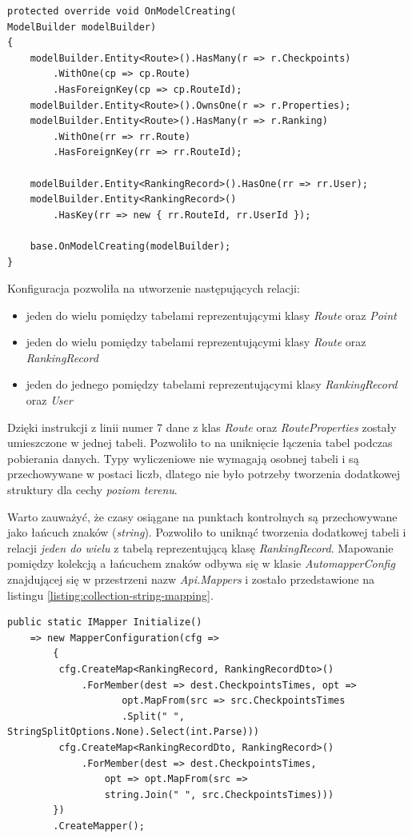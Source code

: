 \begin{lstlisting}[caption={Konfiguracja mapowania relacyjno-obiektowego},label=listing:context]
protected override void OnModelCreating(
ModelBuilder modelBuilder)
{
    modelBuilder.Entity<Route>().HasMany(r => r.Checkpoints)
    	.WithOne(cp => cp.Route)
    	.HasForeignKey(cp => cp.RouteId);
    modelBuilder.Entity<Route>().OwnsOne(r => r.Properties);
    modelBuilder.Entity<Route>().HasMany(r => r.Ranking)
    	.WithOne(rr => rr.Route)
        .HasForeignKey(rr => rr.RouteId);

    modelBuilder.Entity<RankingRecord>().HasOne(rr => rr.User);
    modelBuilder.Entity<RankingRecord>()
    	.HasKey(rr => new { rr.RouteId, rr.UserId });

    base.OnModelCreating(modelBuilder);
}
\end{lstlisting}
Konfiguracja pozwoliła na utworzenie następujących relacji:
\begin{itemize}
\item{jeden do wielu pomiędzy tabelami reprezentującymi klasy \textit{Route}} oraz \textit{Point}
\item{jeden do wielu pomiędzy tabelami reprezentującymi klasy \textit{Route}} oraz \textit{RankingRecord}
\item{jeden do jednego pomiędzy tabelami reprezentującymi klasy \textit{RankingRecord} oraz \textit{User}}
\end{itemize}
Dzięki instrukcji z linii numer 7 dane z klas \textit{Route} oraz \textit{RouteProperties} zostały umieszczone w jednej tabeli. Pozwoliło to na uniknięcie łączenia tabel podczas pobierania danych. Typy wyliczeniowe nie wymagają osobnej tabeli i są przechowywane w postaci liczb, dlatego nie było potrzeby tworzenia dodatkowej struktury dla cechy \textit{poziom terenu}.

Warto zauważyć, że czasy osiągane na punktach kontrolnych są przechowywane jako łańcuch znaków (\textit{string}). Pozwoliło to uniknąć tworzenia dodatkowej tabeli i relacji \textit{jeden do wielu} z tabelą reprezentującą klasę \textit{RankingRecord}. Mapowanie pomiędzy kolekcją a łańcuchem znaków odbywa się w klasie \textit{AutomapperConfig} znajdującej się w przestrzeni nazw \textit{Api.Mappers} i zostało przedstawione na listingu \ref{listing:collection-string-mapping}.
\begin{lstlisting}[caption={Mapowanie pomiedzy kolekcją a łańcuchem znaków},label=listing:collection-string-mapping]
public static IMapper Initialize()
    => new MapperConfiguration(cfg =>
        {
         cfg.CreateMap<RankingRecord, RankingRecordDto>()
             .ForMember(dest => dest.CheckpointsTimes, opt =>
                    opt.MapFrom(src => src.CheckpointsTimes
                    .Split(" ", StringSplitOptions.None).Select(int.Parse)))
         cfg.CreateMap<RankingRecordDto, RankingRecord>()
             .ForMember(dest => dest.CheckpointsTimes,
                 opt => opt.MapFrom(src => 
                 string.Join(" ", src.CheckpointsTimes)))
        })
        .CreateMapper();
\end{lstlisting}

